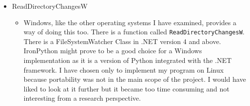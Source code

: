 \documentclass[12pt]{article}
\begin{document}
\begin{itemize}
\begin{itemize}
        I also looked at using the \texttt{kqueue}
        \footnote{http://developer.apple.com/library/mac/\#documentation/Darwin/Reference/ManPages/man2/kqueue.2.html}
        system call that is
        supported by MacOS~X and FreeBSD. It notifies the user
        when a kernel event occurs. However I decided against using
        \texttt{kqueue} as the high level approach of FSEvents
        suits my application's needs.
        \end{itemize}

    \item ReadDirectoryChangesW
        \begin{itemize}
        \item Windows, like the other operating systems
        I have examined, provides a way of doing this
        too. There is a function called \texttt{ReadDirectoryChangesW}.
        There is a FileSystemWatcher Class in .NET version 4 and
        above. IronPython might prove to be a good choice for a
        Windows implementation as it is a version of Python integrated
        with the .NET framework. I have chosen only to implement
        my program on Linux because portability was not in the main
        scope of the project. I would have liked to look
        at it further but it became too time consuming and not interesting
        from a research perspective.
        \end{itemize}
\end{itemize}
\end{document}
